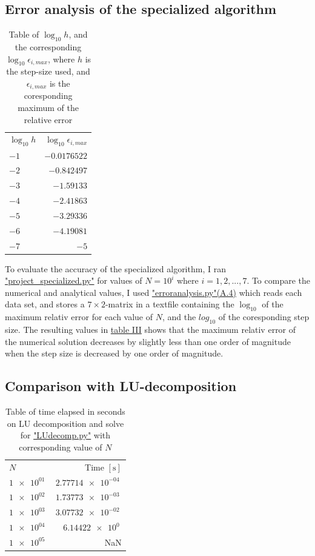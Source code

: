 \documentclass[english,notitlepage,reprint]{revtex4-1}  %
\begin{document}
\subsection{Error analysis of the specialized algorithm}\label{subsec:43}
\begin{table}[H]
	\centering
	\label{tab:431}
	\begin{tabular}{l|r}
	\(\log_{10}h\) & \(\log_{10}\epsilon_{i,max}\) \\
	\(-1\) & \(-0.0176522\) \\
	\(-2\) & \(-0.842497\) \\
	\(-3\) & \(-1.59133\) \\
	\(-4\) & \(-2.41863\) \\
	\(-5\) & \(-3.29336\) \\
	\(-6\) & \(-4.19081\) \\
	\(-7\) & \(-5\) \\
	\end{tabular}
	\caption{Table of \(\log_{10}h\), and the corresponding \(\log_{10}\epsilon_{i,max}\),
	where \(h\) is the step-size used, and \(\epsilon_{i,max}\) is the coresponding
	maximum of the relative error}
\end{table}

To evaluate the accuracy of the specialized algorithm, I ran \hyperref[A:2]{"project\_specialized.py"} for values of \(N=10^{i}\) where \(i=1,2,...,7\). To compare the numerical and analytical values, I used \hyperref[A:4]{"erroranalysis.py"(A.4)} which reads each data set, and stores a \(7\times 2\)-matrix in a textfile containing the \(\log_{10}\) of the maximum relativ error for each value of \(N\), and the \(log_{10}\) of the coresponding step size. The resulting values in \hyperref[tab:431]{table III} shows that the maximum relativ error of the numerical solution decreases by slightly less than one order of magnitude when the step size is decreased by one order of magnitude.

\subsection{Comparison with LU-decomposition}\label{subsec:43}
\begin{table}[H]
	\centering
	\label{tab:441}
	\begin{tabular}{l|r}
	\(N\) & Time \([\si{\second}]\) \\
	\(\SI{1e+01}{}\) & \(\SI{2.77714e-04}{}\) \\
	\(\SI{1e+02}{}\) & \(\SI{1.73773e-03}{}\) \\
	\(\SI{1e+03}{}\) & \(\SI{3.07732e-02}{}\) \\
	\(\SI{1e+04}{}\) & \(\SI{6.14422e0}{}\) \\
	\(\SI{1e+05}{}\) & NaN \\
	\end{tabular}
	\caption{Table of time elapsed in seconds on LU decomposition and solve for
	\hyperref[A:2]{"LUdecomp.py"} with corresponding value of \(N\)}
\end{table}
\end{document}
